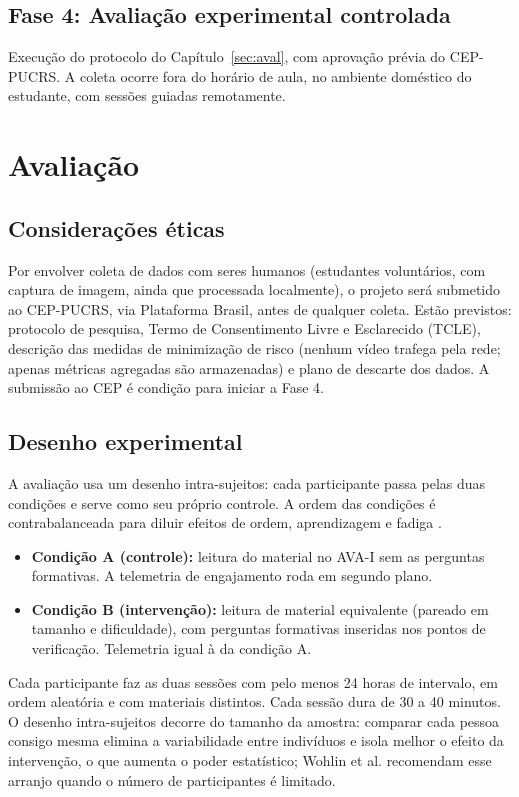 \documentclass[portuguese,oneside]{tcc}
\begin{document}
\section{Fase 4: Avaliação experimental controlada}
Execução do protocolo do Capítulo~\ref{sec:aval}, com aprovação prévia do CEP-PUCRS. A coleta ocorre fora do horário de aula, no ambiente doméstico do estudante, com sessões guiadas remotamente.

\chapter{\label{sec:aval}Avaliação}

\section{Considerações éticas}
Por envolver coleta de dados com seres humanos (estudantes voluntários, com captura de imagem, ainda que processada localmente), o projeto será submetido ao CEP-PUCRS, via Plataforma Brasil, antes de qualquer coleta. Estão previstos: protocolo de pesquisa, Termo de Consentimento Livre e Esclarecido (TCLE), descrição das medidas de minimização de risco (nenhum vídeo trafega pela rede; apenas métricas agregadas são armazenadas) e plano de descarte dos dados. A submissão ao CEP é condição para iniciar a Fase 4.

\section{Desenho experimental}
A avaliação usa um desenho intra-sujeitos: cada participante passa pelas duas condições e serve como seu próprio controle. A ordem das condições é contrabalanceada para diluir efeitos de ordem, aprendizagem e fadiga \cite{WRH12}.

\begin{itemize}
  \item \textbf{Condição A (controle):} leitura do material no AVA-I sem as perguntas formativas. A telemetria de engajamento roda em segundo plano.
  \item \textbf{Condição B (intervenção):} leitura de material equivalente (pareado em tamanho e dificuldade), com perguntas formativas inseridas nos pontos de verificação. Telemetria igual à da condição A.
\end{itemize}

Cada participante faz as duas sessões com pelo menos 24 horas de intervalo, em ordem aleatória e com materiais distintos. Cada sessão dura de 30 a 40 minutos. O desenho intra-sujeitos decorre do tamanho da amostra: comparar cada pessoa consigo mesma elimina a variabilidade entre indivíduos e isola melhor o efeito da intervenção, o que aumenta o poder estatístico; Wohlin et al. \cite{WRH12} recomendam esse arranjo quando o número de participantes é limitado.
\end{document}
